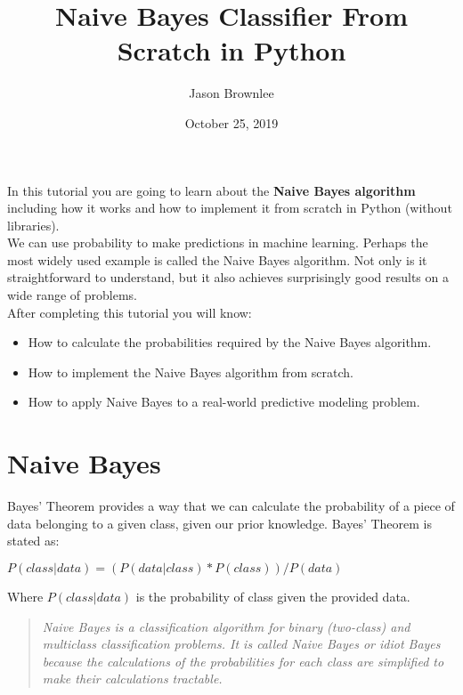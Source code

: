 \documentclass[12pt]{article}
\title{Naive Bayes Classifier From Scratch in Python}
\author{Jason Brownlee}
\date{October 25, 2019}
\begin{document}
\maketitle

\newpage

In this tutorial you are going to learn about the \textbf{Naive Bayes algorithm} including how it works and how to implement it from scratch in Python (without libraries).\\


We can use probability to make predictions in machine learning. Perhaps the most widely used example is called the Naive Bayes algorithm. Not only is it straightforward to understand, but it also achieves surprisingly good results on a wide range of problems.\\

After completing this tutorial you will know:\\

\begin{itemize}
	\item How to calculate the probabilities required by the Naive Bayes algorithm.
	\item How to implement the Naive Bayes algorithm from scratch.
	\item How to apply Naive Bayes to a real-world predictive modeling problem.
\end{itemize}

\section{Naive Bayes}

Bayes' Theorem provides a way that we can calculate the probability of a piece of data belonging to a given class, given our prior knowledge. Bayes’ Theorem is stated as:\\

\begin{center}
$ P(class|data) = (P(data|class) * P(class)) / P(data) $
\end{center}

Where $ P(class|data) $ is the probability of class given the provided data.

\begin{quote}
\textit{Naive Bayes is a classification algorithm for binary (two-class) and multiclass classification problems. It is called Naive Bayes or idiot Bayes because the calculations of the probabilities for each class are simplified to make their calculations tractable.}
\end{quote}
\end{document}
